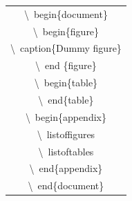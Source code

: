 \documentclass[onecolumn,journal] {IEEEtran}
\begin{document}
\begin{center}

\begin{tabular}{ |c| } 

\hline

\newline

\textbackslash  \ begin\{document\}\\
\textbackslash   \ begin\{figure\}\\
 \textbackslash  \ caption\{Dummy figure\}\\
  \textbackslash  \ end \{figure\}\\
 \textbackslash \ begin\{table\}\\
\textbackslash \ end\{table\} \\
\textbackslash \ begin\{appendix\}\\
 \textbackslash \ listoffigures\\
 \textbackslash  \ listoftables\\
\textbackslash\ end\{appendix\}\\
\textbackslash\ end\{document\}\\
 \hline
\end{tabular}
\end{center} 
\end{document}
